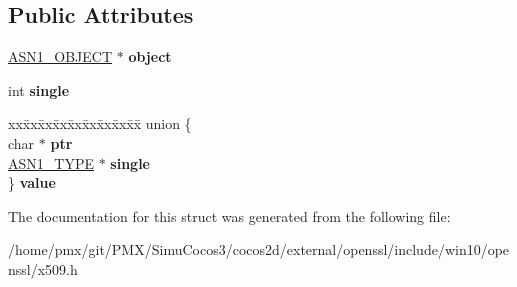 \subsection*{Public Attributes}
\begin{DoxyCompactItemize}
\item 
\mbox{\label{structx509__attributes__st_a646d7a1b46e88eb3b0e337e08bd08a02}} 
\hyperlink{structasn1__object__st}{A\+S\+N1\+\_\+\+O\+B\+J\+E\+CT} $\ast$ {\bfseries object}
\item 
\mbox{\label{structx509__attributes__st_a04dd95e9253f6b16f682e70eb5eec2ca}} 
int {\bfseries single}
\item 
\mbox{\label{structx509__attributes__st_a071a1e9b564212ac99ce8b2b47c575ca}} 
\begin{tabbing}
xx\=xx\=xx\=xx\=xx\=xx\=xx\=xx\=xx\=\kill
union \{\\
\>char $\ast$ {\bfseries ptr}\\
\>\hyperlink{structasn1__type__st}{ASN1\_TYPE} $\ast$ {\bfseries single}\\
\} {\bfseries value}\\

\end{tabbing}\end{DoxyCompactItemize}


The documentation for this struct was generated from the following file\+:\begin{DoxyCompactItemize}
\item 
/home/pmx/git/\+P\+M\+X/\+Simu\+Cocos3/cocos2d/external/openssl/include/win10/openssl/x509.\+h\end{DoxyCompactItemize}
